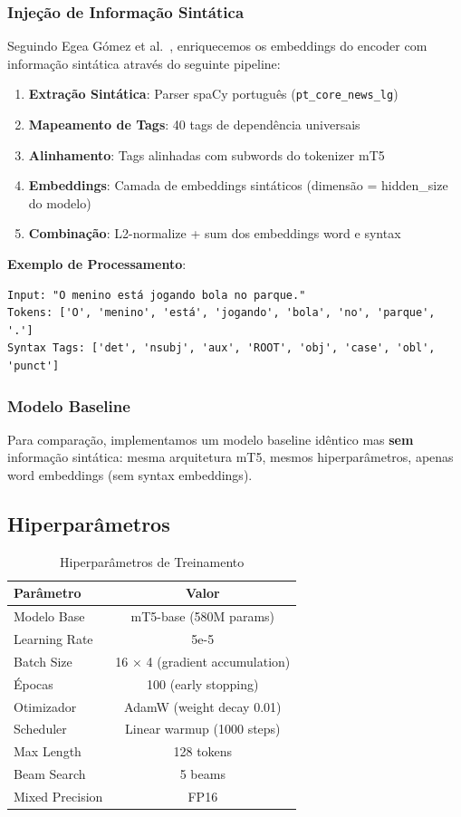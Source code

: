 \documentclass[12pt]{article}
\begin{document}
\subsubsection{Injeção de Informação Sintática}

Seguindo Egea Gómez et al.~\cite{egea2021}, enriquecemos os embeddings do encoder com informação sintática através do seguinte pipeline:

\begin{enumerate}
\item \textbf{Extração Sintática}: Parser spaCy português (\texttt{pt\_core\_news\_lg})
\item \textbf{Mapeamento de Tags}: 40 tags de dependência universais
\item \textbf{Alinhamento}: Tags alinhadas com subwords do tokenizer mT5
\item \textbf{Embeddings}: Camada de embeddings sintáticos (dimensão = hidden\_size do modelo)
\item \textbf{Combinação}: L2-normalize + sum dos embeddings word e syntax
\end{enumerate}

\textbf{Exemplo de Processamento}:
\begin{verbatim}
Input: "O menino está jogando bola no parque."
Tokens: ['O', 'menino', 'está', 'jogando', 'bola', 'no', 'parque', '.']
Syntax Tags: ['det', 'nsubj', 'aux', 'ROOT', 'obj', 'case', 'obl', 'punct']
\end{verbatim}

\subsubsection{Modelo Baseline}

Para comparação, implementamos um modelo baseline idêntico mas \textbf{sem} informação sintática: mesma arquitetura mT5, mesmos hiperparâmetros, apenas word embeddings (sem syntax embeddings).

\subsection{Hiperparâmetros}

\begin{table}[ht]
\centering
\caption{Hiperparâmetros de Treinamento}
\label{tab:hiperparametros}
\begin{tabular}{lc}
\toprule
Parâmetro & Valor \\
\midrule
Modelo Base & mT5-base (580M params) \\
Learning Rate & 5e-5 \\
Batch Size & 16 × 4 (gradient accumulation) \\
Épocas & 100 (early stopping) \\
Otimizador & AdamW (weight decay 0.01) \\
Scheduler & Linear warmup (1000 steps) \\
Max Length & 128 tokens \\
Beam Search & 5 beams \\
Mixed Precision & FP16 \\
\bottomrule
\end{tabular}
\end{table}
\end{document}
